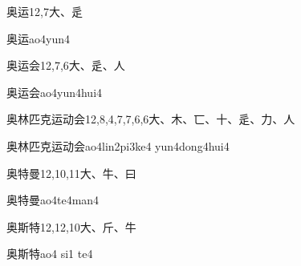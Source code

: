 \begin{entry}{奥运}{12,7}{⼤、⾡}
  \begin{phonetics}{奥运}{ao4yun4}
  \end{phonetics}
\end{entry}

\begin{entry}{奥运会}{12,7,6}{⼤、⾡、⼈}
  \begin{phonetics}{奥运会}{ao4yun4hui4}
  \end{phonetics}
\end{entry}

\begin{entry}{奥林匹克运动会}{12,8,4,7,7,6,6}{⼤、⽊、⼖、⼗、⾡、⼒、⼈}
  \begin{phonetics}{奥林匹克运动会}{ao4lin2pi3ke4 yun4dong4hui4}
  \end{phonetics}
\end{entry}

\begin{entry}{奥特曼}{12,10,11}{⼤、⽜、⽈}
  \begin{phonetics}{奥特曼}{ao4te4man4}
  \end{phonetics}
\end{entry}

\begin{entry}{奥斯特}{12,12,10}{⼤、⽄、⽜}
  \begin{phonetics}{奥斯特}{ao4 si1 te4}
  \end{phonetics}
\end{entry}


